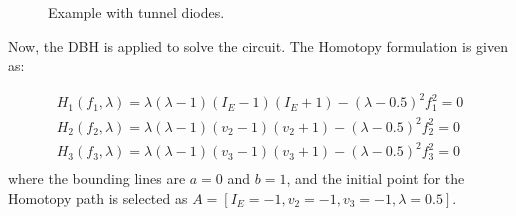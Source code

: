 \documentclass[journal,twocolumn]{IEEEtran}
\begin{document}
\begin{figure}[hbtp]
\begin{center}
\hspace{0.3in}
\end{center}
\caption{Example with tunnel diodes.}
\label{fig:subfig2}
\end{figure}

Now, the DBH is applied to solve the circuit. The Homotopy formulation is given as:

{\tiny
\begin{displaymath}
\begin{array}{c}
H_1(f_1,\lambda)=\lambda(\lambda-1)(I_E-1)(I_E+1)-(\lambda-0.5)^2 f_1^2=0\\
H_2(f_2,\lambda)=\lambda(\lambda-1)(v_2-1)(v_2+1)-(\lambda-0.5)^2 f_2^2=0\\
H_3(f_3,\lambda)=\lambda(\lambda-1)(v_3-1)(v_3+1)-(\lambda-0.5)^2 f_3^2=0\\
\end{array}
\end{displaymath}
}
where the bounding lines are $a=0$ and $b=1$, and the initial point for the Homotopy path is selected as $A=[I_E=-1,v_2=-1,v_3=-1,\lambda=0.5]$.
\end{document}
